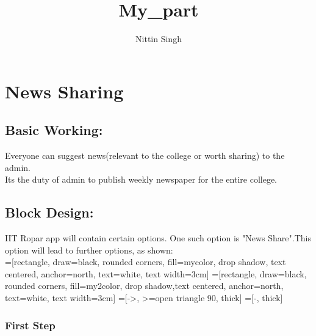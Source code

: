 \documentclass{article}
\title{My\_part}
\author{Nittin Singh}
\begin{document}
\usetikzlibrary{positioning,shapes,shadows,arrows}
\maketitle
\newpage
\section{ News Sharing }
\subsection{Basic Working:}
\par Everyone can suggest news(relevant to the college or worth sharing) to the admin.\\
Its the duty of admin to publish weekly newspaper for the entire college.
\subsection{Block Design:}
 IIT Ropar app will contain certain options. One such option is "News Share".This\\ 
 option will lead to further options, as shown:\\
=[rectangle, draw=black, rounded corners, fill=mycolor, drop shadow, text centered, anchor=north, text=white, text width=3cm]
=[rectangle, draw=black, rounded corners, fill=my2color, drop shadow,text centered, anchor=north, text=white, text width=3cm]
=[->, >=open triangle 90, thick]
=[-, thick]
\linebreak
\subsubsection{First Step}
\end{document}
